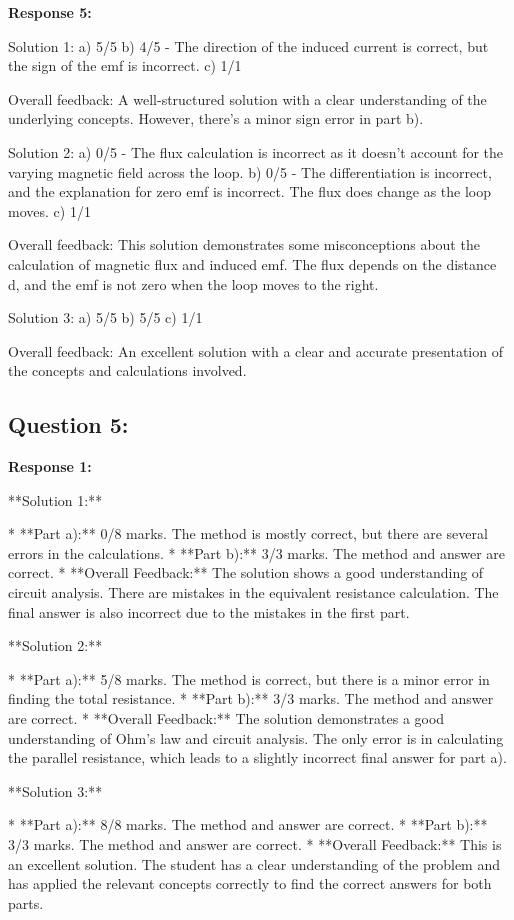 \documentclass[a4paper,11pt]{article}
\begin{document}
\bigskip    
\textbf{Response 5:}

Solution 1:
a) 5/5
b) 4/5 - The direction of the induced current is correct, but the sign of the emf is incorrect.
c) 1/1

Overall feedback: A well-structured solution with a clear understanding of the underlying concepts. However, there's a minor sign error in part b).

Solution 2:
a) 0/5 - The flux calculation is incorrect as it doesn't account for the varying magnetic field across the loop.
b) 0/5 - The differentiation is incorrect, and the explanation for zero emf is incorrect. The flux does change as the loop moves.
c) 1/1

Overall feedback: This solution demonstrates some misconceptions about the calculation of magnetic flux and induced emf. The flux depends on the distance d, and the emf is not zero when the loop moves to the right.

Solution 3:
a) 5/5
b) 5/5
c) 1/1

Overall feedback: An excellent solution with a clear and accurate presentation of the concepts and calculations involved.

\subsection*{Question 5:}

\textbf{Response 1:}

**Solution 1:**

*   **Part a):** 0/8 marks. The method is mostly correct, but there are several errors in the calculations. 
*   **Part b):** 3/3 marks. The method and answer are correct.
*   **Overall Feedback:** The solution shows a good understanding of circuit analysis. There are mistakes in the equivalent resistance calculation. The final answer is also incorrect due to the mistakes in the first part.

**Solution 2:**

*   **Part a):** 5/8 marks. The method is correct, but there is a minor error in finding the total resistance.
*   **Part b):** 3/3 marks. The method and answer are correct.
*   **Overall Feedback:** The solution demonstrates a good understanding of Ohm's law and circuit analysis. The only error is in calculating the parallel resistance, which leads to a slightly incorrect final answer for part a).

**Solution 3:**

*   **Part a):** 8/8 marks. The method and answer are correct.
*   **Part b):** 3/3 marks. The method and answer are correct.
*   **Overall Feedback:** This is an excellent solution. The student has a clear understanding of the problem and has applied the relevant concepts correctly to find the correct answers for both parts.
\end{document}
